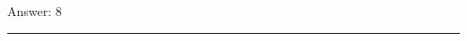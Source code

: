 \documentclass[11pt,paper=a4,answers]{exam}
\begin{document}
\begin{questions}
\begin{solution}
\vspace{15pt}
Answer: \colorbox{yellow!100}{8}
\end{solution}

\end{questions}
\begin{center}
\rule{.5\textwidth}{1pt}
\end{center}
\end{document}
